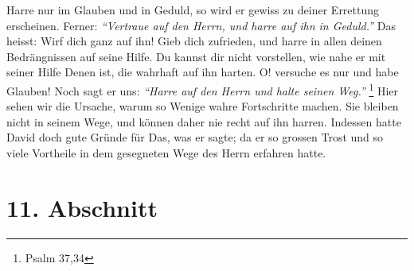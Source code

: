 Harre nur im Glauben und in Geduld, so wird er gewiss zu deiner Errettung
erscheinen. Ferner:
\textit{"`Vertraue auf den Herrn, und harre auf ihn in Geduld."'} Das
heisst: Wirf dich ganz auf ihn! Gieb dich zufrieden, und harre in allen deinen
Bedrängnissen auf seine Hilfe. Du kannst dir nicht vorstellen, wie nahe er mit
seiner Hilfe Denen ist, die wahrhaft auf ihn harten. O! versuche es nur und habe
Glauben! Noch sagt er uns:
\textit{"`Harre auf den Herrn und halte seinen Weg."'}
\footnote{Psalm 37,34}
Hier sehen wir die Ursache, warum so Wenige wahre
Fortschritte machen. Sie bleiben nicht in seinem Wege, und können daher nie
recht auf ihn harren. Indessen hatte David doch gute Gründe für Das, was er
sagte; da er so grossen Trost und so viele Vortheile in dem gesegneten Wege des
Herrn erfahren hatte.

\section{11. Abschnitt} \label{kap6_ab11}

